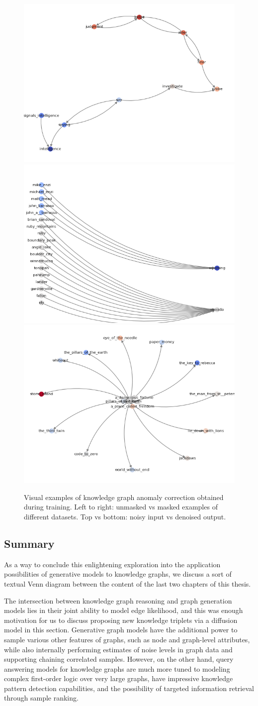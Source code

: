 \begin{figure}[H]
    \hfill
    \includegraphics[width=0.16\linewidth]{figures/kg_generation/wordnet_masked_clean.png}
    \hfill
    \includegraphics[width=0.16\linewidth]{figures/kg_generation/nell_clean.png}
    \hfill
    \includegraphics[width=0.16\linewidth]{figures/kg_generation/nell_masked_clean.png}
    \caption[Visual examples of knowledge graph anomaly correction.]{Visual examples of knowledge graph anomaly correction obtained during training. Left to right: unmasked vs masked examples of different datasets. Top vs bottom: noisy input vs denoised output.}
    \label{fig:kg_diffusion_examples}
\end{figure}

\subsection{Summary}
As a way to conclude this enlightening exploration into the application possibilities of generative models to knowledge graphs, we discuss a sort of textual Venn diagram between the content of the last two chapters of this thesis. 

The intersection between knowledge graph reasoning and graph generation models lies in their joint ability to model edge likelihood, and this was enough motivation for us to discuss proposing new knowledge triplets via a diffusion model in this section. Generative graph models have the additional power to sample various other features of graphs, such as node and graph-level attributes, while also internally performing estimates of noise levels in graph data and supporting chaining correlated samples. However, on the other hand, query answering models for knowledge graphs are much more tuned to modeling complex first-order logic over very large graphs, have impressive knowledge pattern detection capabilities, and the possibility of targeted information retrieval through sample ranking.